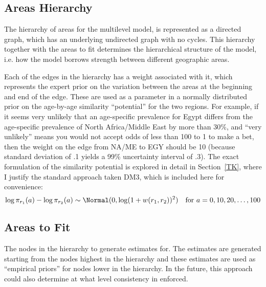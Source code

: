 \subsection{Areas Hierarchy}
The hierarchy of areas for the multilevel model, is represented as a
directed graph, which has an underlying undirected graph with no
cycles.  This hierarchy together with the areas to fit determines the
hierarchical structure of the model, i.e. how the model borrows
strength between different geographic areas.

Each of the edges in the hierarchy has a weight associated with it,
which represents the expert prior on the variation between the areas
at the beginning and end of the edge.  These are used as a parameter
in a normally distributed prior on the age-by-age similarity
``potential'' for the two regions.  For example, if it seems very
unlikely that an age-specific prevalence for Egypt differs from the
age-specific prevalence of North Africa/Middle East by more than 30\%,
and ``very unlikely'' means you would not accept odds of less than 100
to 1 to make a bet, then the weight on the edge from NA/ME to EGY should be
10 (because standard deviation of .1 yields a 99\% uncertainty
interval of .3).  The exact formulation of the similarity potential is
explored in detail in Section~\ref{TK}, where I justify the standard approach taken
DM3, which is included here for convenience:
\[
\log \pi_{r_1}(a) - \log \pi_{r_2}(a) \sim \Normal(0, \log(1 + w(r_1, r_2))^2)\quad \text{for } a = 0, 10, 20, \ldots, 100
\]

\subsection{Areas to Fit}
The nodes in the hierarchy to generate estimates for.  The estimates
are generated starting from the nodes highest in the hierarchy and
these estimates are used as ``empirical priors'' for nodes lower in
the hierarchy.  In the future, this approach could also determine at
what level consistency in enforced.

